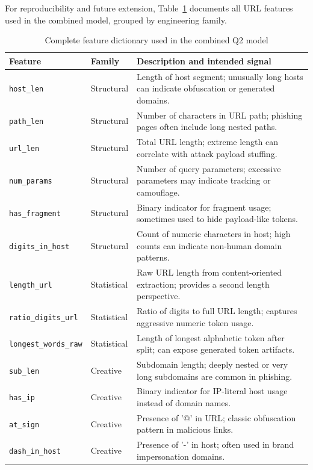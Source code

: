 For reproducibility and future extension, Table~\ref{tab:feature-dict} documents all URL features used in the combined model, grouped by engineering family.

\begin{table}[t]
\centering
\caption{Complete feature dictionary used in the combined Q2 model}
\label{tab:feature-dict}
\begin{tabular}{p{3.0cm}p{2.2cm}p{9.2cm}}
\toprule
Feature & Family & Description and intended signal \\
\midrule
\texttt{host\_len} & Structural & Length of host segment; unusually long hosts can indicate obfuscation or generated domains. \\
\texttt{path\_len} & Structural & Number of characters in URL path; phishing pages often include long nested paths. \\
\texttt{url\_len} & Structural & Total URL length; extreme length can correlate with attack payload stuffing. \\
\texttt{num\_params} & Structural & Number of query parameters; excessive parameters may indicate tracking or camouflage. \\
\texttt{has\_fragment} & Structural & Binary indicator for fragment usage; sometimes used to hide payload-like tokens. \\
\texttt{digits\_in\_host} & Structural & Count of numeric characters in host; high counts can indicate non-human domain patterns. \\
\texttt{length\_url} & Statistical & Raw URL length from content-oriented extraction; provides a second length perspective. \\
\texttt{ratio\_digits\_url} & Statistical & Ratio of digits to full URL length; captures aggressive numeric token usage. \\
\texttt{longest\_words\_raw} & Statistical & Length of longest alphabetic token after split; can expose generated token artifacts. \\
\texttt{sub\_len} & Creative & Subdomain length; deeply nested or very long subdomains are common in phishing. \\
\texttt{has\_ip} & Creative & Binary indicator for IP-literal host usage instead of domain names. \\
\texttt{at\_sign} & Creative & Presence of '@' in URL; classic obfuscation pattern in malicious links. \\
\texttt{dash\_in\_host} & Creative & Presence of '-' in host; often used in brand impersonation domains. \\

\end{tabular}
\end{table}
